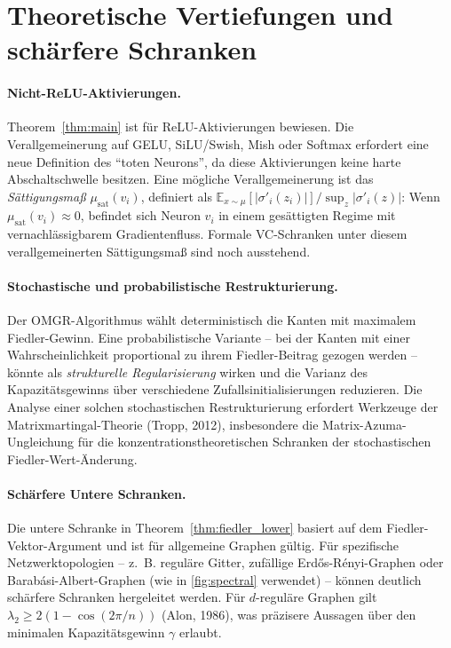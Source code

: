 \documentclass[12pt, a4paper, openany]{report}
\newcommand{\E}{\mathbb{E}}
\begin{document}
\section{Theoretische Vertiefungen und schärfere Schranken}
\label{sec:outlook_theory}

\paragraph{Nicht-ReLU-Aktivierungen.}
Theorem~\ref{thm:main} ist für ReLU-Aktivierungen bewiesen.  Die
Verallgemeinerung auf GELU, SiLU/Swish, Mish oder Softmax erfordert
eine neue Definition des ``toten Neurons'', da diese Aktivierungen keine
harte Abschaltschwelle besitzen.  Eine mögliche Verallgemeinerung ist das
\emph{Sättigungsmaß} $\mu_{\mathrm{sat}}(v_i)$, definiert als
$\E_{x \sim \mu}[|\sigma'_i(z_i)|] / \sup_{z} |\sigma'_i(z)|$: Wenn
$\mu_{\mathrm{sat}}(v_i) \approx 0$, befindet sich Neuron $v_i$ in einem
gesättigten Regime mit vernachlässigbarem Gradientenfluss.  Formale
VC-Schranken unter diesem verallgemeinerten Sättigungsmaß sind noch
ausstehend.

\paragraph{Stochastische und probabilistische Restrukturierung.}
Der OMGR-Algorithmus wählt deterministisch die Kanten mit maximalem
Fiedler-Gewinn.  Eine probabilistische Variante -- bei der Kanten mit
einer Wahrscheinlichkeit proportional zu ihrem Fiedler-Beitrag gezogen
werden -- könnte als \emph{strukturelle Regularisierung} wirken und
die Varianz des Kapazitätsgewinns über verschiedene Zufallsinitialisierungen
reduzieren.  Die Analyse einer solchen stochastischen Restrukturierung
erfordert Werkzeuge der Matrixmartingal-Theorie (Tropp, 2012), insbesondere
die Matrix-Azuma-Ungleichung für die konzentrationstheoretischen
Schranken der stochastischen Fiedler-Wert-Änderung.

\paragraph{Schärfere Untere Schranken.}
Die untere Schranke in Theorem~\ref{thm:fiedler_lower} basiert auf dem
Fiedler-Vektor-Argument und ist für allgemeine Graphen gültig.  Für
spezifische Netzwerktopologien -- z.~B. reguläre Gitter, zufällige
Erdős-Rényi-Graphen oder Barabási-Albert-Graphen (wie in
\cref{fig:spectral} verwendet) -- können deutlich schärfere
Schranken hergeleitet werden.  Für $d$-reguläre Graphen gilt
$\lambda_2 \geq 2(1 - \cos(2\pi/n))$ (Alon, 1986), was präzisere
Aussagen über den minimalen Kapazitätsgewinn $\gamma$ erlaubt.
\end{document}

